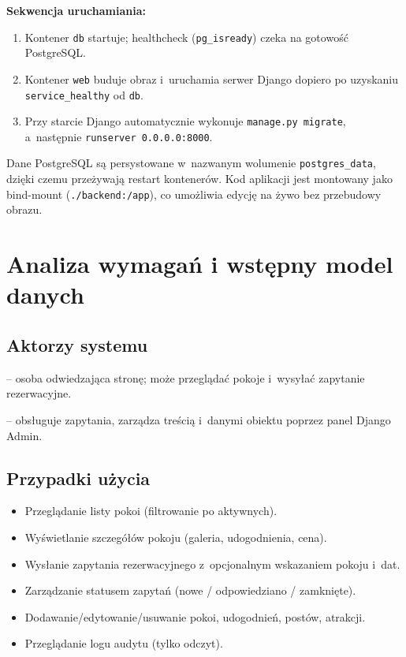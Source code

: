 \documentclass[12pt,a4paper]{article}
\begin{document}
\textbf{Sekwencja uruchamiania:}
\begin{enumerate}[nosep]
  \item Kontener \texttt{db} startuje; healthcheck (\texttt{pg\_isready}) czeka
        na gotowość PostgreSQL.
  \item Kontener \texttt{web} buduje obraz i~uruchamia serwer Django dopiero po
        uzyskaniu \texttt{service\_healthy} od \texttt{db}.
  \item Przy starcie Django automatycznie wykonuje \texttt{manage.py migrate},
        a~następnie \texttt{runserver 0.0.0.0:8000}.
\end{enumerate}

Dane PostgreSQL są persystowane w~nazwanym wolumenie \texttt{postgres\_data},
dzięki czemu przeżywają restart kontenerów. Kod aplikacji jest montowany jako
bind-mount (\texttt{./backend:/app}), co umożliwia edycję na żywo bez przebudowy obrazu.

\section{Analiza wymagań i wstępny model danych}

\subsection{Aktorzy systemu}

\begin{description}[nosep]
  \item[Gość] -- osoba odwiedzająca stronę; może przeglądać pokoje i~wysyłać
    zapytanie rezerwacyjne.
  \item[Administrator] -- obsługuje zapytania, zarządza treścią i~danymi obiektu
    poprzez panel Django Admin.
\end{description}

\subsection{Przypadki użycia}

\begin{itemize}[nosep]
  \item Przeglądanie listy pokoi (filtrowanie po aktywnych).
  \item Wyświetlanie szczegółów pokoju (galeria, udogodnienia, cena).
  \item Wysłanie zapytania rezerwacyjnego z~opcjonalnym wskazaniem pokoju i~dat.
  \item Zarządzanie statusem zapytań (nowe / odpowiedziano / zamknięte).
  \item Dodawanie/edytowanie/usuwanie pokoi, udogodnień, postów, atrakcji.
  \item Przeglądanie logu audytu (tylko odczyt).
\end{itemize}
\end{document}
